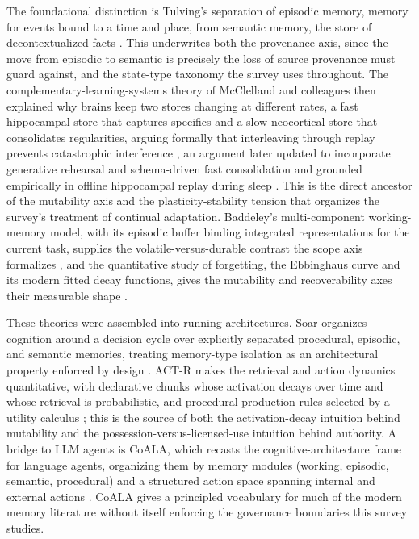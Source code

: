 The foundational distinction is Tulving's separation of episodic memory, memory for events bound to a time and place, from semantic memory, the store of decontextualized facts \citep{tulving1972episodic}. This underwrites both the provenance axis, since the move from episodic to semantic is precisely the loss of source provenance must guard against, and the state-type taxonomy the survey uses throughout. The complementary-learning-systems theory of McClelland and colleagues then explained why brains keep two stores changing at different rates, a fast hippocampal store that captures specifics and a slow neocortical store that consolidates regularities, arguing formally that interleaving through replay prevents catastrophic interference \citep{mcclelland1995complementary}, an argument later updated to incorporate generative rehearsal and schema-driven fast consolidation \citep{kumaran2016complementary} and grounded empirically in offline hippocampal replay during sleep \citep{wilson1994reactivation}. This is the direct ancestor of the mutability axis and the plasticity-stability tension that organizes the survey's treatment of continual adaptation. Baddeley's multi-component working-memory model, with its episodic buffer binding integrated representations for the current task, supplies the volatile-versus-durable contrast the scope axis formalizes \citep{baddeley2000episodic}, and the quantitative study of forgetting, the Ebbinghaus curve and its modern fitted decay functions, gives the mutability and recoverability axes their measurable shape \citep{murre2015replication}.

These theories were assembled into running architectures. Soar organizes cognition around a decision cycle over explicitly separated procedural, episodic, and semantic memories, treating memory-type isolation as an architectural property enforced by design \citep{laird2012soar}. ACT-R makes the retrieval and action dynamics quantitative, with declarative chunks whose activation decays over time and whose retrieval is probabilistic, and procedural production rules selected by a utility calculus \citep{anderson2004actr}; this is the source of both the activation-decay intuition behind mutability and the possession-versus-licensed-use intuition behind authority. A bridge to LLM agents is CoALA, which recasts the cognitive-architecture frame for language agents, organizing them by memory modules (working, episodic, semantic, procedural) and a structured action space spanning internal and external actions \citep{sumers2024cognitivearchitectureslanguageagents}. CoALA gives a principled vocabulary for much of the modern memory literature without itself enforcing the governance boundaries this survey studies.

